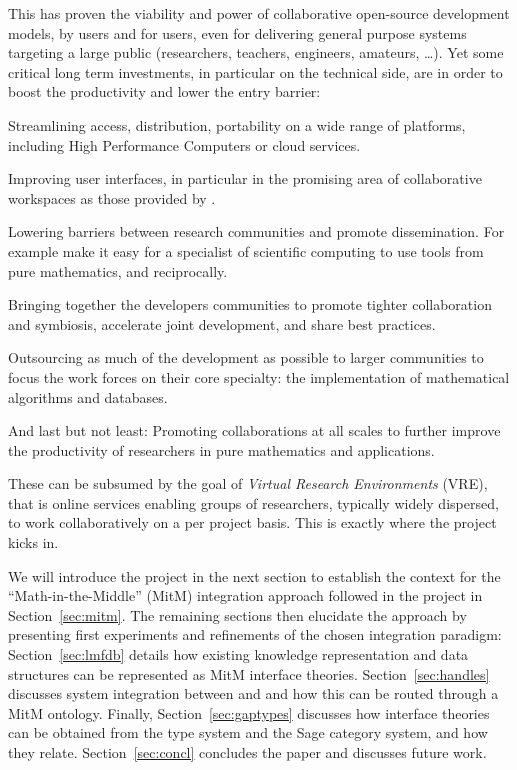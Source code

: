 This has proven the viability and power of collaborative open-source development models,
by users and for users, even for delivering general purpose systems targeting a large
public (researchers, teachers, engineers, amateurs, \ldots). Yet some critical long term
investments, in particular on the technical side, are in order to boost the productivity
and lower the entry barrier:
\begin{compactitem}
\item Streamlining access, distribution, portability on a wide range of platforms, including
  High Performance Computers or cloud services.
\item Improving user interfaces, in particular in the promising area of collaborative
  workspaces as those provided by \SMC.
\item Lowering barriers between research communities and promote dissemination. For example
  make it easy for a specialist of scientific computing to use tools from pure
  mathematics, and reciprocally.
\item Bringing together the developers communities to promote tighter collaboration and
  symbiosis, accelerate joint development, and share best practices.
\item Outsourcing as much of the development as possible to larger communities to focus
  the work forces on their core specialty: the implementation of mathematical algorithms
  and databases.
\item And last but not least: Promoting collaborations at all scales to further improve
  the productivity of researchers in pure mathematics and applications.
\end{compactitem}
These can be subsumed by the goal of \emph{Virtual Research Environments} (VRE), that is
online services enabling groups of researchers, typically widely dispersed, to work
collaboratively on a per project basis. This is exactly where the \ODK project kicks in. 

We will introduce the \ODK project in the next section to establish the context for the
``Math-in-the-Middle'' (MitM) integration approach followed in the project in
Section~\ref{sec:mitm}. The remaining sections then elucidate the approach by presenting
first experiments and refinements of the chosen integration paradigm:
Section~\ref{sec:lmfdb} details how existing knowledge representation and data structures
can be represented as MitM interface theories. Section~\ref{sec:handles} discusses system
integration between \GAP and \Sage and how this can be routed through a MitM
ontology. Finally, Section~\ref{sec:gaptypes} discusses how interface theories can be
obtained from the \GAP type system and the Sage category system, and how they
relate. Section~\ref{sec:concl} concludes the paper and discusses future work.





